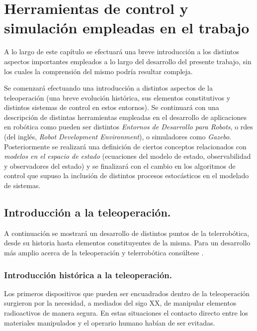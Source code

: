 \chapter[Herramientas de control y simulación empleadas]{Herramientas de control y simulación empleadas en el trabajo}

A lo largo de este capítulo se efectuará una breve introducción a los distintos aspectos importantes empleados a lo largo del desarrollo del presente trabajo, sin los cuales la comprensión del mismo podría resultar compleja. \par 

Se comenzará efectuando una introducción a distintos aspectos de la teleoperación (una breve evolución histórica, sus elementos constitutivos y distintos sistemas de control en estos entornos). Se continuará con una descripción de distintas herramientas empleadas en el desarrollo de aplicaciones en robótica como pueden ser distintos \emph{Entornos de Desarrollo para Robots}, o \acrshort{rde}s (del inglés, \emph{Robot Development Environment}), o simuladores como \emph{Gazebo}. Posteriormente se realizará una definición de ciertos conceptos relacionados con \emph{modelos en el espacio de estado} (ecuaciones del modelo de estado, observabilidad y observadores del estado) y se finalizará con el cambio en los algoritmos de control que supuso la inclusión de distintos procesos estocásticos en el modelado de sistemas. \par 

\newpage
\section{Introducción a la teleoperación.}

A continuación se mostrará un desarrollo de distintos puntos de la telerrobótica, desde su historia hasta elementos constituyentes de la misma. Para un desarrollo más amplio acerca de la teleoperación y telerrobótica consúltese \cite{barrientos2007fundamentos}. \par 

\subsection{Introducción histórica a la teleoperación.}

Los primeros dispositivos que pueden ser encuadrados dentro de la teleoperación surgieron por la necesidad, a mediados del sigo XX, de manipular elementos radioactivos de manera segura. En estas situaciones el contacto directo entre los materiales manipulados y el operario humano habían de ser evitadas. \par 

